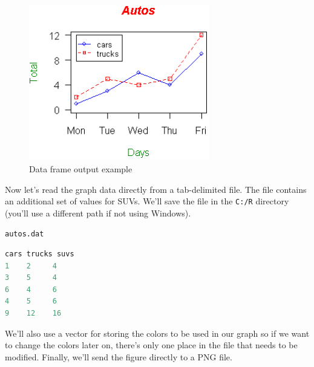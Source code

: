 \documentclass[10pt]{book}
\begin{document}
\begin{figure}[H]
    \begin{flushleft}
        \includegraphics[width=0.7\textwidth]{line_script4.png}
        \caption{Data frame output example}
        \label{fig:dataframe}
    \end{flushleft}
\end{figure}

Now let's read the graph data directly from a tab-delimited file. The file contains an additional set of values for SUVs. We'll save the file in the \texttt{C:/R} directory (you'll use a different path if not using Windows).

\texttt{autos.dat}

\begin{lstlisting}[language=R]
cars trucks suvs
1    2     4
3    5     4
6    4     6
4    5     6
9    12    16
\end{lstlisting}

We'll also use a vector for storing the colors to be used in our graph so if we want to change the colors later on, there's only one place in the file that needs to be modified. Finally, we'll send the figure directly to a PNG file.
\end{document}
